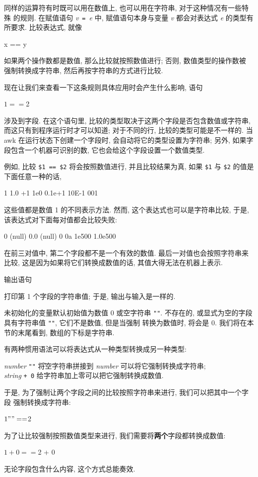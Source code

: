 同样的运算符有时既可以用在数值上, 也可以用在字符串, 对于这种情况有一些特殊
的规则. 在赋值语句 \textit{v}\ \verb'='\ \textit{e} 中, 赋值语句本身与变量
\textit{v} 都会对表达式 \textit{e} 的类型有所要求. 比较表达式, 就像
\begin{awkcode}
    x == y
\end{awkcode}
如果两个操作数都是数值, 那么比较就按照数值进行; 否则, 数值类型的操作数被
强制转换成字符串, 然后再按字符串的方式进行比较.

现在让我们来查看一下这条规则具体应用时会产生什么影响, 语句
\begin{awkcode}
    $1 == $2
\end{awkcode}
涉及到字段. 在这个语句里, 比较的类型取决于这两个字段是否包含数值或字符串,
而这只有到程序运行时才可以知道; 对于不同的行, 比较的类型可能是不一样的.
当 awk 在运行状态下创建一个字段时, 会自动将它的类型设置为字符串; 另外,
如果字段包含一个机器可识别的数, 它也会给这个字段设置一个数值类型.

例如, 比较 \verb'$1 == $2' 将会按照数值进行, 并且比较结果为真, 如果
\verb'$1' 与 \verb'$2' 的值是下面任意一种的话,
\begin{file}
    1   1.0    +1   1e0    0.1e+1   10E-1    001
\end{file}
这些值都是数值 1 的不同表示方法. 然而, 这个表达式也可以是字符串比较, 于是,
该表达式对下面每对值都会比较失败:
\begin{file}
    0           (null)
    0.0         (null)
    0           0a
    1e500       1.0e500
\end{file}
在前三对值中, 第二个字段都不是一个有效的数值.
最后一对值也会按照字符串来比较,
这是因为如果将它们转换成数值的话, 其值大得无法在机器上表示.

输出语句
打印第 1 个字段的字符串值; 于是, 输出与输入是一样的.

未初始化的变量默认初始值为数值 0 或空字符串 \verb'""'.
不存在的, 或显式为空的字段具有字符串值 \verb'""', 它们不是数值, 但是当强制
转换为数值时, 将会是 0. 我们将在本节的末尾看到, 数组的下标是字符串.

有两种惯用语法可以将表达式从一种类型转换成另一种类型:
\begin{tabbing}
    \indent\textit{number} \verb'""'  \hspace{2em} \= 将空字符串拼接到
    \textit{number} 可以将它强制转换成字符串; \\
    \indent\textit{string} \verb'+ 0'  \> 给字符串加上零可以把它强制转换成数值.
\end{tabbing}
于是, 为了强制让两个字段之间的比较按照字符串来进行, 我们可以把其中一个字段
强制转换成字符串:
\begin{awkcode}
    $1 "" == $2
\end{awkcode}
为了让比较强制按照数值类型来进行, 我们需要将\textbf{两个}字段都转换成数值:
\begin{awkcode}
    $1 + 0 == $2 + 0
\end{awkcode}
无论字段包含什么内容, 这个方式总能奏效.

